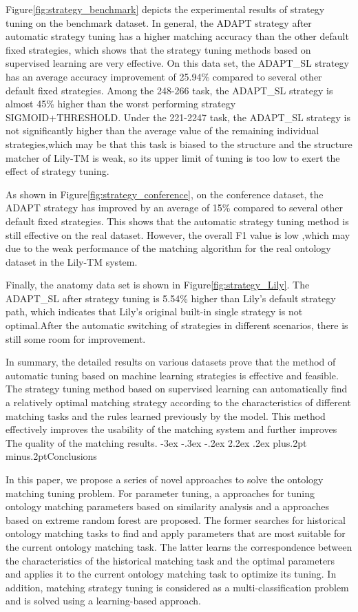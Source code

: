 \documentclass[twoside]{article}
\makeatletter
\def\section{\@startsection{section}{1}{\z@}%
 {-3ex \@plus -.3ex \@minus -.2ex}%
 {2.2ex \@plus.2ex}%
{\normalfont\normalsize\protect\baselineskip=14.5pt plus.2pt minus.2pt\bfseries}}
\makeatother
\begin{document}
Figure\ref{fig:strategy_benchmark} depicts the experimental results of strategy tuning on the benchmark dataset.
In general, the ADAPT strategy after automatic strategy tuning has a higher matching accuracy than the other default fixed strategies, which shows that the strategy tuning methods based on supervised learning are very effective.
On this data set, the ADAPT\_SL strategy has an average accuracy improvement of 25.94\% compared to several other default fixed strategies.
Among the 248-266 task, the ADAPT\_SL strategy is almost 45\% higher than the worst performing strategy SIGMOID+THRESHOLD.
Under the 221-2247 task, the ADAPT\_SL strategy is not significantly higher than the average value of the remaining individual strategies,which may be that this task is biased to the structure and the structure matcher of Lily-TM is weak, so its upper limit of tuning is too low to exert the effect of strategy tuning.

As shown in Figure\ref{fig:strategy_conference}, on the conference dataset, the ADAPT strategy has improved by an average of 15\% compared to several other default fixed strategies. This shows that the automatic strategy tuning method is still effective on the real dataset. However, the overall  F1 value is low ,which may due to the weak performance of the matching algorithm for the real ontology dataset in the Lily-TM system.

Finally, the anatomy data set is shown in Figure\ref{fig:strategy_Lily}. The ADAPT\_SL after strategy tuning is 5.54\% higher than Lily's default strategy path, which indicates that Lily's original built-in single strategy is not optimal.After the automatic switching of strategies in different scenarios, there is still some room for improvement.

In summary, the detailed results on various datasets prove that the method of automatic tuning based on machine learning strategies is effective and feasible.
The strategy tuning method based on supervised learning can automatically find a relatively optimal matching strategy according to the characteristics of different matching tasks and the rules learned previously by the model.
This method effectively improves the usability of the matching system and further improves The quality of the matching results.
\section{Conclusions}

In this paper, we propose a series of novel approaches to solve the ontology matching tuning problem.
For parameter tuning, a approaches for tuning ontology matching parameters based on similarity analysis and a approaches based on extreme random forest are proposed.
The former searches for historical ontology matching tasks to find and apply parameters that are most suitable for the current ontology matching task.
The latter learns the correspondence between the characteristics of the historical matching task and the optimal parameters and applies it to the current ontology matching task to optimize its tuning.
In addition, matching strategy tuning is considered as a multi-classification problem and is solved using a learning-based approach.
\end{document}

